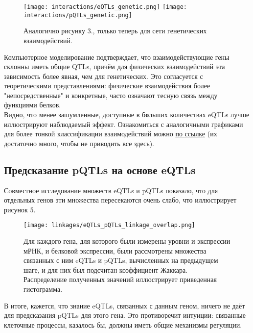 \documentclass[11pt,a4paper]{report}
\theoremstyle{definition}
\theoremstyle{definition}
\theoremstyle{definition}
\begin{document}
		\newpage
		\begin{figure}[H]
			\caption{Аналогично рисунку 3., только теперь для сети генетических взаимодействий.}
			\texttt{[image: interactions/eQTLs\_genetic.png]}
			\texttt{[image: interactions/pQTLs\_genetic.png]}
		\end{figure}
		
		Компьютерное моделирование подтверждает, что взаимодействующие гены склонны иметь общие QTLs, причём для физических взаимодействий эта зависимость более явная, чем для генетических. Это согласуется с теоретическими представлениями: физические взаимодействия более "непосредственные" и конкретные, часто означают тесную связь между функциями белков.\\
		
		Видно, что менее зашумленные, доступные в б\textbf{о}льших количествах eQTLs лучше иллюстрируют наблюдаемый эффект. Ознакомиться с аналогичными графиками для более тонкой классификации взаимодействий можно \href{https://github.com/ivanov-v-v/eQTL_analysis/tree/master/img/interactions}{по ссылке} (их достаточно много, чтобы не приводить все здесь).\\
	\subsection{Предсказание pQTLs на основе eQTLs}
		Совместное исследование множеств eQTLs и pQTLs показало, что для отдельных генов эти множества пересекаются очень слабо, что иллюстрирует рисунок 5.
		\begin{figure}[H]
			\caption{Для каждого гена, для которого были измерены уровни и экспрессии мРНК, и белковой экспрессии, были рассмотрены множества связанных с ним eQTLs и pQTLs, вычисленных на предыдущем шаге, и для них был подсчитан коэффициент Жаккара. Распределение полученных значений иллюстрирует приведенная гистограмма.}
			\centerline{\texttt{[image: linkages/eQTLs\_pQTLs\_linkage\_overlap.png]}}
		\end{figure}
		
		В итоге, кажется, что знание eQTLs, связанных с данным геном, ничего не даёт для предсказания pQTLs для этого гена. Это противоречит интуиции: связанные клеточные процессы, казалось бы, должны иметь общие механизмы регуляции.\\ 
		
\end{document}
